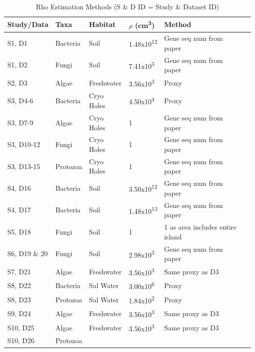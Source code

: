 \begin{table}[h]
    \caption{Rho Estimation Methods (S \& D ID = Study \& Dataset ID)}
    \label{crouch}
    \begin{tabular}{  l  p{2cm} p{2cm}  p{1.5cm} p{5cm} p{5cm}}
        \toprule
\textbf{Study/Data}   
&\textbf{Taxa}
&\textbf{Habitat}   
& \textbf{$\rho$ (cm\textsuperscript{3})}   
& \textbf{Method} \\\midrule
S1, D1 
& Bacteria
& Soil
& 1.48x10\textsuperscript{12}   
& Gene seq num from paper \\\hline
S1, D2   
& Fungi
& Soil
& 7.41x10\textsuperscript{3}              
& Gene seq num from paper \\\hline
S2, D3  
&Algae
&Freshwater
& 3.56x10\textsuperscript{3}   
& Proxy \cite{pasztaleniec2010phytoplankton} \\\hline
S3, D4-6  
&Bacteria
&Cryo Holes
& 4.50x10\textsuperscript{4}   
& Proxy \cite{cameron2012structure} \\\hline
S3, D7-9  
&Algae
&Cryo Holes
& 1 
& Gene seq num from paper \\\hline
S3, D10-12  
&Fungi
&Cryo Holes
& 1  
& Gene seq num from paper \\\hline
S3, D13-15  
&Protozoa
&Cryo Holes
& 1   
& Gene seq num from paper \\\hline
S4, D16 
&Bacteria
&Soil
& 3.50x10\textsuperscript{12} 
& Gene seq num from paper \\\hline
S4, D17 
&Bacteria
&Soil
& 1.48x10\textsuperscript{13}  
& Gene seq num from paper \\\hline
S5, D18 
&Fungi
&Soil
& 1     
& 1 as area includes entire island \\\hline
S6, D19 \& 20 
&Fungi
&Soil
& 2.98x10\textsuperscript{3}   
& Gene seq num from paper \\\hline
S7, D21 
&Algae
&Freshwater 
& 3.56x10\textsuperscript{3}   
& Same proxy as D3 \\\hline
S8, D22
&Bacteria
&Sal Water
& 3.00x10\textsuperscript{6}    
& Proxy \cite{anton2000extremely} \\\hline
S8, D23 
&Protozoa
&Sal Water
& 1.84x10\textsuperscript{2}          
& Proxy \cite{elloumi2006composition} \\\hline
S9, D24 
&Algae
&Freshwater 
& 3.56x10\textsuperscript{3}               
& Same proxy as D3 \\\hline
S10, D25 
&Algae 
&Freshwater
& 3.56x10\textsuperscript{3}             
& Same proxy as D3 \\\hline
S10, D26 
&Protozoa

\end{tabular}
\end{table}
